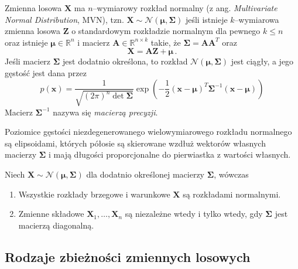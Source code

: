 \documentclass{myclass}
\numberwithin{equation}{subsection}
\begin{document}
\begin{definition}
Zmienna losowa \(\bm{X}\) ma \(n\)--wymiarowy rozkład normalny (z ang. \textit{Multivariate Normal
Distribution}, MVN), tzn. \(\bm{X} \sim \mathcal{N}(\bm{\mu}, \bm{\Sigma})\) jeśli istnieje
\(k\)--wymiarowa zmienna losowa \(\bm{Z}\) o standardowym rozkładzie normalnym dla pewnego \(k \leq
n\) oraz istnieje \(\bm{\mu} \in \mathbb{R}^n\) i macierz \(\bm{A} \in \mathbb{R}^{n \times k}\)
takie, że \(\bm{\Sigma} = \bm{A}\bm{A}^T\) oraz
\begin{equation*}
    \bm{X} = \bm{A}\bm{Z} + \bm{\mu}\,.
\end{equation*}
Jeśli macierz \(\bm{\Sigma}\) jest dodatnio określona, to rozkład \(\mathcal{N}(\bm{\mu},
\bm{\Sigma})\) jest ciągły, a jego gęstość jest dana przez
\begin{equation*}
    p(\bm{x}) = \frac{1}{\sqrt{(2\pi)^n\det\bm{\Sigma}}}\exp\left(-\frac{1}{2}(\bm{x}-\bm{\mu})^T\bm{\Sigma}^{-1}(\bm{x}-\bm{\mu})\right)
\end{equation*}
Macierz \(\bm{\Sigma}^{-1}\) nazywa się \emph{macierzą precyzji}.
\end{definition}

Poziomice gęstości niezdegenerowanego wielowymiarowego rozkładu normalnego są elipsoidami, których
półosie są skierowane wzdłuż wektorów własnych macierzy \(\bm{\Sigma}\) i mają długości
proporcjonalne do pierwiastka z wartości własnych.

\begin{theorem}\label{th:mvn} Niech \(\bm{X} \sim
\mathcal{N}(\bm{\mu}, \bm{\Sigma})\) dla dodatnio określonej macierzy \(\bm{\Sigma}\), wówczas
\begin{enumerate}

    \item Wszystkie rozkłady brzegowe i warunkowe \(\bm{X}\) są rozkładami normalnymi.

    \item Zmienne składowe \(\bm{X}_1,\ldots,\bm{X}_n\) są niezależne wtedy i tylko wtedy, gdy
    \(\bm{\Sigma}\) jest macierzą diagonalną.
    
\end{enumerate}
\end{theorem}


\subsection{Rodzaje zbieżności zmiennych losowych}
\end{document}
